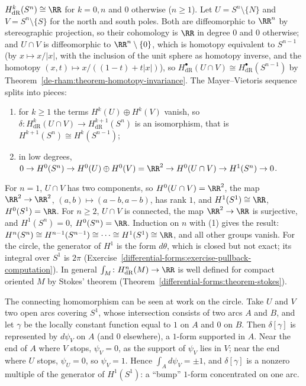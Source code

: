 \begin{example}\label{de-rham:example-spheres}
$H^k_{\mathrm{dR}}(S^n) \cong \RR$ for $k = 0, n$ and $0$ otherwise ($n \geq 1$). Let $U = S^n \setminus \{N\}$ and $V = S^n \setminus \{S\}$ for the north and south poles. Both are
diffeomorphic to $\RR^n$ by stereographic projection, so their cohomology is $\RR$ in degree $0$ and $0$ otherwise; and $U \cap V$ is diffeomorphic to $\RR^n \setminus \{0\}$, which is
homotopy equivalent to $S^{n-1}$ (by $x \mapsto x/|x|$, with the inclusion of the unit sphere as homotopy inverse, and the homotopy $(x, t) \mapsto x/((1 - t) + t|x|)$), so
$H^\bullet_{\mathrm{dR}}(U \cap V) \cong H^\bullet_{\mathrm{dR}}(S^{n-1})$ by Theorem~\ref{de-rham:theorem-homotopy-invariance}. The Mayer--Vietoris sequence splits into pieces:
\begin{enumerate}
\item for $k \geq 1$ the terms $H^k(U) \oplus H^k(V)$ vanish, so $\delta \colon H^k_{\mathrm{dR}}(U \cap V) \to H^{k+1}_{\mathrm{dR}}(S^n)$ is an isomorphism, that is
$H^{k+1}(S^n) \cong H^k(S^{n-1})$;
\item in low degrees, $0 \to H^0(S^n) \to H^0(U) \oplus H^0(V) = \RR^2 \to H^0(U \cap V) \to H^1(S^n) \to 0$.
\end{enumerate}
For $n = 1$, $U \cap V$ has two components, so $H^0(U \cap V) = \RR^2$, the map $\RR^2 \to \RR^2$, $(a, b) \mapsto (a - b, a - b)$, has rank $1$, and $H^1(S^1) \cong \RR$, $H^0(S^1) = \RR$. For
$n \geq 2$, $U \cap V$ is connected, the map $\RR^2 \to \RR$ is surjective, and $H^1(S^n) = 0$, $H^0(S^n) = \RR$. Induction on $n$ with (1) gives the result: $H^n(S^n) \cong H^{n-1}(S^{n-1}) \cong \cdots \cong H^1(S^1) \cong \RR$,
and all other groups vanish. For the circle, the generator of $H^1$ is the form $d\theta$, which is closed but not exact; its integral over $S^1$ is $2\pi$
(Exercise~\ref{differential-forms:exercise-pullback-computation}). In general $\int_M \colon H^n_{\mathrm{dR}}(M) \to \RR$ is well defined for compact oriented $M$ by Stokes' theorem
(Theorem~\ref{differential-forms:theorem-stokes}).

The connecting homomorphism can be seen at work on the circle. Take $U$ and $V$ two open arcs covering $S^1$, whose intersection consists of two arcs $A$ and $B$, and let $\gamma$ be the
locally constant function equal to $1$ on $A$ and $0$ on $B$. Then $\delta[\gamma]$ is represented by $d\psi_V$ on $A$ (and $0$ elsewhere), a $1$-form supported in $A$. Near the end of $A$
where $V$ stops, $\psi_V = 0$, as the support of $\psi_V$ lies in $V$; near the end where $U$ stops, $\psi_U = 0$, so $\psi_V = 1$. Hence $\int_Ad\psi_V = \pm1$, and $\delta[\gamma]$ is a nonzero
multiple of the generator of $H^1(S^1)$: a ``bump'' $1$-form concentrated on one arc.
\end{example}

